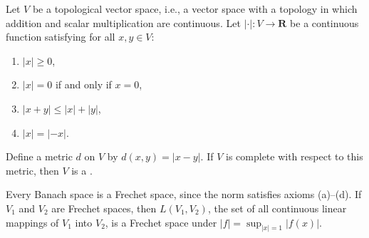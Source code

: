 Let $V$ be a topological vector space, i.e., a vector space with a topology in which addition and scalar multiplication are continuous. Let $|\cdot|: V \to \mathbf{R}$ be a continuous function satisfying for all $x, y \in V$:

\begin{enumerate}
\item[(a)] $|x| \geq 0$,
\item[(b)] $|x| = 0$ if and only if $x = 0$,
\item[(c)] $|x + y| \leq |x| + |y|$,
\item[(d)] $|x| = |{-x}|$.
\end{enumerate}

Define a metric $d$ on $V$ by $d(x, y) = |x - y|$. If $V$ is complete with respect to this metric, then $V$ is a .

Every Banach space is a Frechet space, since the norm satisfies axioms (a)--(d). If $V_1$ and $V_2$ are Frechet spaces, then $L(V_1, V_2)$, the set of all continuous linear mappings of $V_1$ into $V_2$, is a Frechet space under $|f| = \sup_{|x|=1} |f(x)|$.
